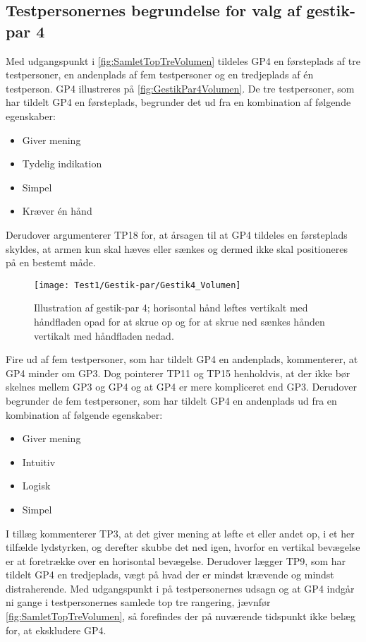 \subsection{Testpersonernes begrundelse for valg af gestik-par 4}
\label{TestresultaterValgAfGestikkerBegrundelseGP4Volumen}
%
Med udgangspunkt i \autoref{fig:SamletTopTreVolumen} tildeles GP4 en førsteplads af tre testpersoner, en andenplads af fem testpersoner og en tredjeplads af én testperson. GP4 illustreres på \autoref{fig:GestikPar4Volumen}. De tre testpersoner, som har tildelt GP4 en førsteplads, begrunder det ud fra en kombination af følgende egenskaber: 
%
\begin{multicols}{3}
    \begin{itemize}
        \item Giver mening
        \item Tydelig indikation
        \item Simpel
        \item Kræver én hånd
\end{itemize}
\end{multicols}
\noindent
%
Derudover argumenterer TP18 for, at årsagen til at GP4 tildeles en førsteplads skyldes, at armen kun skal hæves eller sænkes og dermed ikke skal positioneres på en bestemt måde.
%
\begin{figure}[H]
	\centering
	\texttt{[image: Test1/Gestik-par/Gestik4\_Volumen]}
	\caption{Illustration af gestik-par 4; horisontal hånd løftes vertikalt med håndfladen opad for at skrue op og for at skrue ned sænkes hånden vertikalt med håndfladen nedad.}
	\label{fig:GestikPar4Volumen}
\end{figure}
\noindent
%
Fire ud af fem testpersoner, som har tildelt GP4 en andenplads, kommenterer, at GP4 minder om GP3. Dog pointerer TP11 og TP15 henholdvis, at der ikke bør skelnes mellem GP3 og GP4 og at GP4 er mere kompliceret end GP3. Derudover begrunder de fem testpersoner, som har tildelt GP4 en andenplads ud fra en kombination af følgende egenskaber: 
%
\begin{multicols}{3}
    \begin{itemize}
        \item Giver mening
        \item Intuitiv
        \item Logisk
        \item Simpel
\end{itemize}
\end{multicols}
\noindent
%
I tillæg kommenterer TP3, at det giver mening at løfte et eller andet op, i et her tilfælde lydstyrken, og derefter skubbe det ned igen, hvorfor en vertikal bevægelse er at foretrække over en horisontal bevægelse. Derudover lægger TP9, som har tildelt GP4 en tredjeplads, vægt på hvad der er mindst krævende og mindst distraherende.\blankline 
%
Med udgangspunkt i på testpersonernes udsagn og at GP4 indgår ni gange i testpersonernes samlede top tre rangering, jævnfør \autoref{fig:SamletTopTreVolumen}, så forefindes der på nuværende tidspunkt ikke belæg for, at ekskludere GP4.
%
